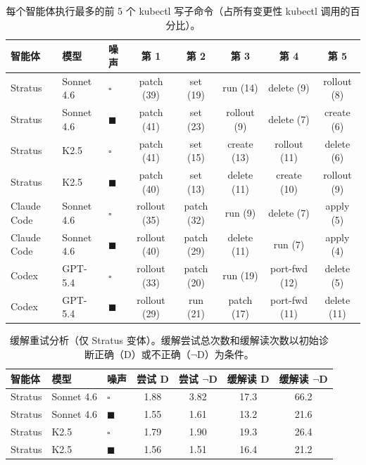 \documentclass[11pt,UTF8,fontset=fandol]{ctexart}
\begin{document}
\begin{table}[H]\centering
\caption{每个智能体执行最多的前 5 个 kubectl 写子命令（占所有变更性 kubectl 调用的百分比）。}
\label{tab:11}
\setlength{\tabcolsep}{4pt}
\begin{tabular}{lllccccc}
\toprule
智能体 & 模型 & 噪声 & 第 1 & 第 2 & 第 3 & 第 4 & 第 5 \\
\midrule
Stratus & Sonnet 4.6 & $\square$ & patch (39) & set (19) & run (14) & delete (9) & rollout (8) \\
Stratus & Sonnet 4.6 & $\blacksquare$ & patch (41) & set (23) & rollout (9) & delete (7) & create (6) \\
Stratus & K2.5 & $\square$ & patch (41) & set (15) & create (13) & rollout (11) & delete (6) \\
Stratus & K2.5 & $\blacksquare$ & patch (40) & set (13) & delete (11) & create (10) & rollout (9) \\
Claude Code & Sonnet 4.6 & $\square$ & rollout (35) & patch (32) & run (9) & delete (7) & apply (5) \\
Claude Code & Sonnet 4.6 & $\blacksquare$ & rollout (40) & patch (29) & delete (11) & run (7) & apply (4) \\
Codex & GPT-5.4 & $\square$ & rollout (33) & patch (20) & run (19) & port-fwd (12) & delete (5) \\
Codex & GPT-5.4 & $\blacksquare$ & rollout (29) & run (21) & patch (17) & port-fwd (11) & delete (11) \\
\bottomrule
\end{tabular}
\end{table}

\begin{table}[H]\centering
\caption{缓解重试分析（仅 Stratus 变体）。缓解尝试总次数和缓解读次数以初始诊断正确（D）或不正确（$\neg$D）为条件。}
\label{tab:12}
\begin{tabular}{lllcccc}
\toprule
智能体 & 模型 & 噪声 & 尝试 D & 尝试 $\neg$D & 缓解读 D & 缓解读 $\neg$D \\
\midrule
Stratus & Sonnet 4.6 & $\square$ & 1.88 & 3.82 & 17.3 & 66.2 \\
Stratus & Sonnet 4.6 & $\blacksquare$ & 1.55 & 1.61 & 13.2 & 21.6 \\
Stratus & K2.5 & $\square$ & 1.79 & 1.90 & 19.3 & 26.4 \\
Stratus & K2.5 & $\blacksquare$ & 1.56 & 1.51 & 16.4 & 21.2 \\
\bottomrule
\end{tabular}
\end{table}
\end{document}
